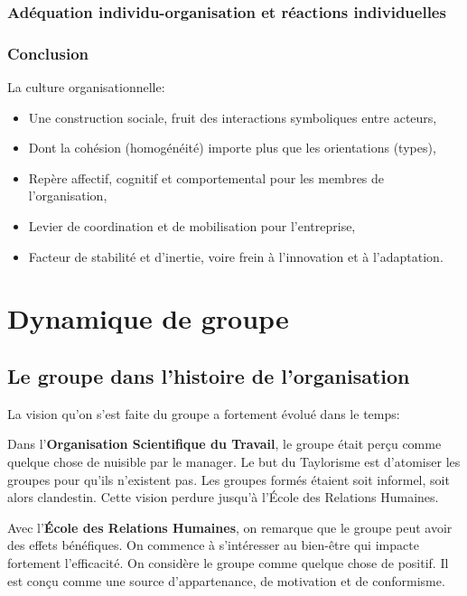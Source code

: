 \documentclass[12pt]{article}
\begin{document}
		\subsubsection*{Adéquation individu-organisation et réactions individuelles}
		\subsubsection{Conclusion}
		
		La culture organisationnelle: 
		\begin{itemize}
		\item Une construction sociale, fruit des interactions symboliques entre acteurs, 
		\item Dont la cohésion (homogénéité) importe plus que les orientations (types), 
		\item Repère affectif, cognitif et comportemental pour les membres de l'organisation, 
		\item Levier de coordination et de mobilisation pour l'entreprise, 
		\item Facteur de stabilité et d'inertie, voire frein à l'innovation et à l'adaptation. 
		\end{itemize}
		
\section{Dynamique de groupe}
	\subsection{Le groupe dans l’histoire de l’organisation}
	
	La vision qu'on s'est faite du groupe a fortement évolué dans le temps: \newline
	
	Dans l'\textbf{Organisation Scientifique du Travail}, le groupe était perçu comme quelque chose de nuisible par le manager. Le but du Taylorisme est d'atomiser les groupes pour qu'ils n'existent pas. Les groupes formés étaient soit informel, soit alors clandestin. Cette vision perdure jusqu'à l'École des Relations Humaines.\newline
	
	Avec l'\textbf{École des Relations Humaines}, on remarque que le groupe peut avoir des effets bénéfiques. On commence à s'intéresser au bien-être qui impacte fortement l'efficacité. On considère le groupe comme quelque chose de positif. Il est conçu comme une source d'appartenance, de motivation et de conformisme.\newline
	
\end{document}
